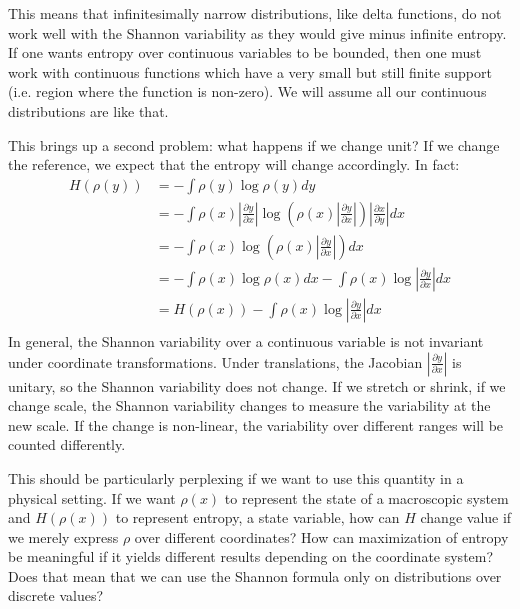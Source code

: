 \documentclass{article}
\begin{document}
This means that infinitesimally narrow distributions, like delta functions, do not work well with the Shannon variability as they would give minus infinite entropy. If one wants entropy over continuous variables to be bounded, then one must work with continuous functions which have a very small but still finite support (i.e. region where the function is non-zero). We will assume all our continuous distributions are like that.

This brings up a second problem: what happens if we change unit? If we change the reference, we expect that the entropy will change accordingly. In fact:
\begin{equation}
\begin{aligned}
H(\rho(y)) &= - \int \rho(y) \log \rho(y) dy \\
&= - \int \rho(x) \left|\frac{\partial y}{\partial x}\right| \log \left(\rho(x)\left|\frac{\partial y}{\partial x}\right| \right) \left|\frac{\partial x}{\partial y}\right| dx \\
&= - \int \rho(x)  \log \left(\rho(x)\left|\frac{\partial y}{\partial x}\right| \right)  dx \\
&= - \int \rho(x)  \log \rho(x)  dx - \int \rho(x)  \log \left|\frac{\partial y}{\partial x}\right|  dx \\
&= H(\rho(x)) - \int \rho(x)  \log \left|\frac{\partial y}{\partial x}\right|  dx \\
\end{aligned}
\end{equation}
In general, the Shannon variability over a continuous variable is not invariant under coordinate transformations. Under translations, the Jacobian $\left|\frac{\partial y}{\partial x}\right|$ is unitary, so the Shannon variability does not change. If we stretch or shrink, if we change scale, the Shannon variability changes to measure the variability at the new scale. If the change is non-linear, the variability over different ranges will be counted differently.

This should be particularly perplexing if we want to use this quantity in a physical setting. If we want $\rho(x)$ to represent the state of a macroscopic system and $H(\rho(x))$ to represent entropy, a state variable, how can $H$ change value if we merely express $\rho$ over different coordinates? How can maximization of entropy be meaningful if it yields different results depending on the coordinate system? Does that mean that we can use the Shannon formula only on distributions over discrete values?
\end{document}
